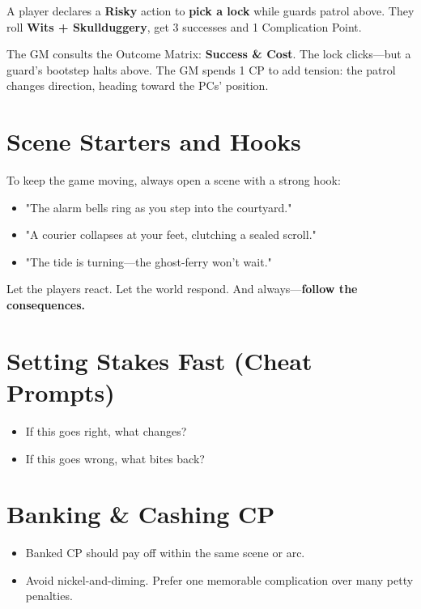 A player declares a \textbf{Risky} action to \textbf{pick a lock} while guards patrol above. They roll \textbf{Wits + Skullduggery}, get 3 successes and 1 Complication Point.

The GM consults the Outcome Matrix: \textbf{Success \& Cost}. The lock clicks---but a guard's bootstep halts above. The GM spends 1 CP to add tension: the patrol changes direction, heading toward the PCs' position.

\section*{Scene Starters and Hooks}

To keep the game moving, always open a scene with a strong hook:

\begin{itemize}
    \item "The alarm bells ring as you step into the courtyard."
    \item "A courier collapses at your feet, clutching a sealed scroll."
    \item "The tide is turning---the ghost-ferry won't wait."
\end{itemize}

Let the players react. Let the world respond. And always---\textbf{follow the consequences.}

\section*{Setting Stakes Fast (Cheat Prompts)}

\begin{itemize}
    \item If this goes right, what changes?
    \item If this goes wrong, what bites back?
\end{itemize}

\section*{Banking \& Cashing CP}

\begin{itemize}
    \item Banked CP should pay off within the same scene or arc.
    \item Avoid nickel-and-diming. Prefer one memorable complication over many petty penalties.
\end{itemize}

